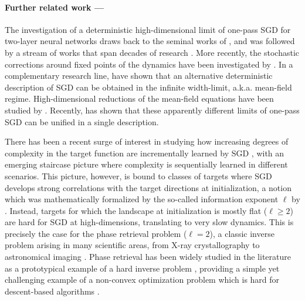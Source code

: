 \paragraph{Further related work ---}
The investigation of a deterministic high-dimensional limit of one-pass SGD for two-layer neural networks draws back to the seminal works of \cite{saad1995exact,saad1995line,saad1996dynamics}, and was followed by a stream of works that span decades of research \citep{riegler1995line,copelli1995line,reents1998self,goldt2019dynamics,goldt2020modeling,goldt2022gaussian,veiga2022phase,arnaboldi2023high}. More recently, the stochastic corrections around fixed points of the dynamics have been investigated by \cite{arous2022high}. In a complementary research line, \cite{mei2018mean,chizat2018global,rotskoff2022trainability,ghorbani2019limitations,sirignano2020mean} have shown that an alternative deterministic description of SGD can be obtained in the infinite width-limit, a.k.a. mean-field regime. High-dimensional reductions of the mean-field equations have been studied by \cite{abbe2022merged,abbe2023sgd,hajjar2023symmetries,berthier2023learning}. Recently, \cite{veiga2022phase,arnaboldi2023high} has shown that these apparently different limits of one-pass SGD can be unified in a single description. 

There has been a recent surge of interest in studying how increasing degrees of complexity in the target function are incrementally learned by SGD \citep{abbe2022merged,abbe2023sgd,jacot2022saddle,boursier2022gradient,berthier2023learning}, with an emerging staircase picture where complexity is sequentially learned in different scenarios. This picture, however, is bound to classes of targets where SGD develops strong correlations with the target directions at initialization, a notion which was mathematically formalized by the so-called information exponent \(\ell\) by \cite{arous2021online}. Instead, targets for which the landscape at initialization is mostly flat (\(\ell\geq 2\)) are hard for SGD at high-dimensions, translating to very slow dynamics. This is precisely the case for the phase retrieval problem (\(\ell = 2\)), a classic inverse problem arising in many scientific areas, from X-ray crystallography to astronomical imaging \citep{jaganathan2016phase,dong2023phase}. Phase retrieval has been widely studied in the literature as a prototypical example of a hard inverse problem \citep{candes2013phase,candes2013phaselift,candes2015phase,mondelli2018fundamental,barbier2019optimal,aubin2020exact,maillard2020phase}, providing a simple yet challenging example of a non-convex optimization problem which is hard for descent-based algorithms \citep{sun2016geometric,tan2019online,tan2018phase,chen2019gradient,davis2020nonsmooth,saraomannelli2020optimization,saraomannelli2020complex,mignacco2021stochasticity}. 
